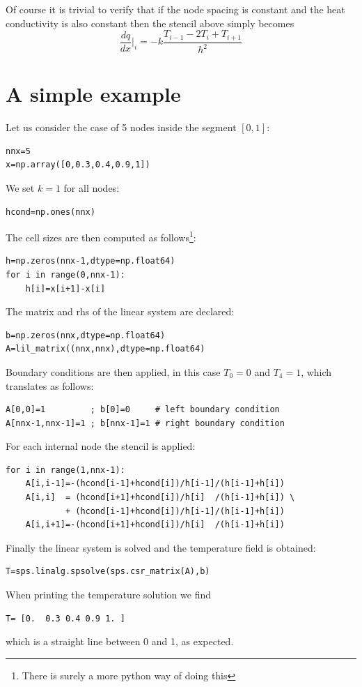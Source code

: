 Of course it is trivial to verify that if the node spacing is constant and the 
heat conductivity is also constant then the stencil above simply becomes 
\[
\frac{dq}{dx}|_i = -k \frac{T_{i-1}-2T_i+T_{i+1}}{h^2}
\] 

\section*{A simple example}

Let us consider the case of 5 nodes inside the segment $[0,1]$:
\begin{lstlisting}
nnx=5                         
x=np.array([0,0.3,0.4,0.9,1]) 
\end{lstlisting}
We set $k=1$ for all nodes:
\begin{lstlisting}
hcond=np.ones(nnx)  
\end{lstlisting}
The cell sizes are then computed as follows\footnote{There is surely a more python
way of doing this}:
\begin{lstlisting}
h=np.zeros(nnx-1,dtype=np.float64)
for i in range(0,nnx-1):
    h[i]=x[i+1]-x[i]
\end{lstlisting}
The matrix and rhs of the linear system are declared:
\begin{lstlisting}
b=np.zeros(nnx,dtype=np.float64)
A=lil_matrix((nnx,nnx),dtype=np.float64)
\end{lstlisting}
Boundary conditions are then applied, in this case $T_0=0$ and $T_4=1$, 
which translates as follows:
\begin{lstlisting}
A[0,0]=1         ; b[0]=0     # left boundary condition
A[nnx-1,nnx-1]=1 ; b[nnx-1]=1 # right boundary condition
\end{lstlisting}
For each internal node the stencil is applied:
\begin{lstlisting}
for i in range(1,nnx-1):
    A[i,i-1]=-(hcond[i-1]+hcond[i])/h[i-1]/(h[i-1]+h[i])
    A[i,i]  = (hcond[i+1]+hcond[i])/h[i]  /(h[i-1]+h[i]) \
            + (hcond[i-1]+hcond[i])/h[i-1]/(h[i-1]+h[i]) 
    A[i,i+1]=-(hcond[i+1]+hcond[i])/h[i]  /(h[i-1]+h[i]) 
\end{lstlisting}
Finally the linear system is solved and the temperature 
field is obtained:
\begin{lstlisting}
T=sps.linalg.spsolve(sps.csr_matrix(A),b)
\end{lstlisting}
When printing the temperature solution we find 
\begin{lstlisting}
T= [0.  0.3 0.4 0.9 1. ] 
\end{lstlisting}
which is a straight line between 0 and 1, as expected.





